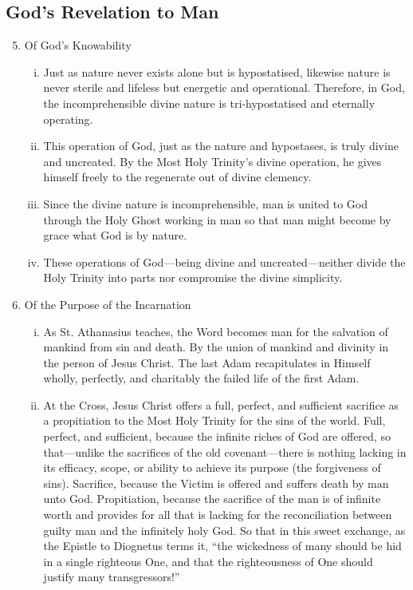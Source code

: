 \subsection{God's Revelation to Man}
\begin{enumerate}
\setcounter{enumi}{4}
	\item Of God's Knowability
	\begin{enumerate}[i.]
		\item Just as nature never exists alone but is hypostatised, likewise nature is never sterile and lifeless but energetic and operational. Therefore, in God, the incomprehensible divine nature is tri-hypostatised and eternally operating.
		\item This operation of God, just as the nature and hypostases, is truly divine and uncreated. By the Most Holy Trinity's divine operation, he gives himself freely to the regenerate out of divine clemency.
		\item Since the divine nature is incomprehensible, man is united to God through the Holy Ghost working in man so that man might become by grace what God is by nature.
		\item These operations of God---being divine and uncreated---neither divide the Holy Trinity into parts nor compromise the divine simplicity.
	\end{enumerate}
	\item Of the Purpose of the Incarnation
	\begin{enumerate}[i.]
		\item As St. Athanasius teaches, the Word becomes man for the salvation of mankind from sin and death. By the union of mankind and divinity in the person of Jesus Christ. The last Adam recapitulates in Himself wholly, perfectly, and charitably the failed life of the first Adam.
		\item At the Cross, Jesus Christ offers a full, perfect, and sufficient sacrifice as a propitiation to the Most Holy Trinity for the sins of the world. Full, perfect, and sufficient, because the infinite riches of God are offered, so that---unlike the sacrifices of the old covenant---there is nothing lacking in its efficacy, scope, or ability to achieve its purpose (the forgiveness of sins). Sacrifice, because the Victim is offered and suffers death by man unto God. Propitiation, because the sacrifice of the man is of infinite worth and provides for all that is lacking for the reconciliation between guilty man and the infinitely holy God. So that in this sweet exchange, as the Epistle to Diognetus terms it, ``the wickedness of many should be hid in a single righteous One, and that the righteousness of One should justify many transgressors!''

\end{enumerate}
\end{enumerate}
